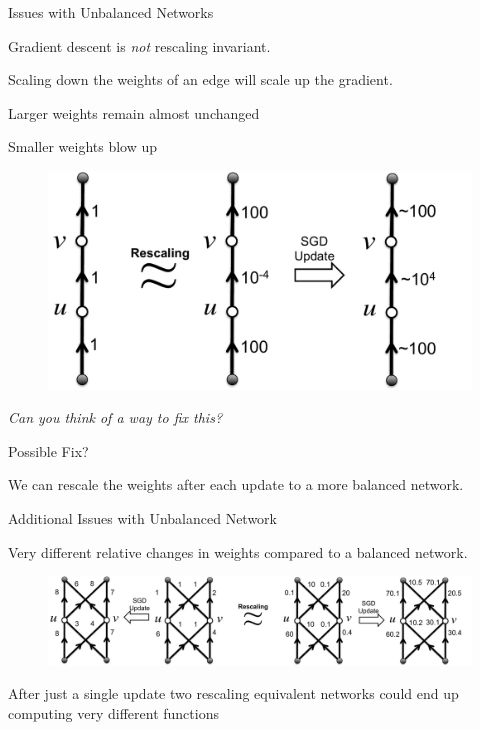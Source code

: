 \documentclass[presentation,xcolor={usenames,dvipsnames},10pt]{beamer}
\begin{document}
\begin{frame}{Issues with Unbalanced Networks}

\bit
\item Gradient descent is \emph{not} rescaling invariant. 
\item Scaling down the weights of an edge will scale up the gradient. 
\item Larger weights remain almost unchanged 
\item Smaller weights blow up

\begin{figure}
	\includegraphics[scale=0.3]{pic3.pdf}
\end{figure}

\eit
\textit{ Can you think of a way to fix this?
}
\end{frame}


\begin{frame}{Possible Fix?}
\bit 
\item We can rescale the weights after each update to a more balanced network.
\eit 
\end{frame} 

\begin{frame}{Additional Issues with Unbalanced Network}
\bit 
\item Very different relative changes in weights compared to a balanced network. 

\begin{figure}
	\includegraphics[scale=0.24]{pic4.pdf}
\end{figure}
\item After just a single update two rescaling equivalent networks could end up computing very different functions
\eit
\end{frame}
\end{document}

